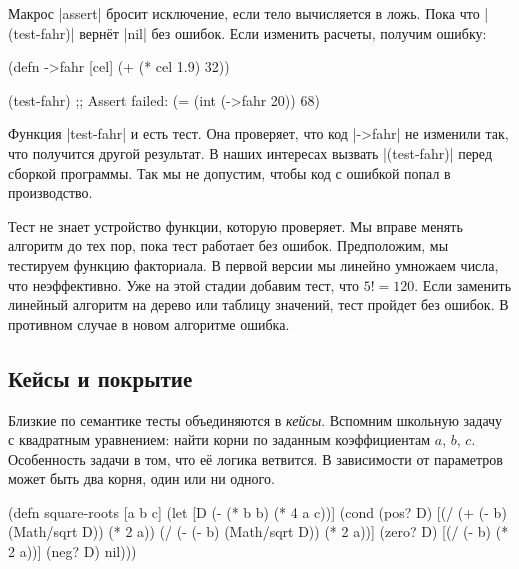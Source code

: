 Макрос \spverb|assert| бросит исключение, если тело вычисляется в ложь. Пока что
\spverb|(test-fahr)| вернёт \spverb|nil| без ошибок. Если изменить расчеты,
получим ошибку:

\begin{english}
  \begin{clojure}
(defn ->fahr [cel]
  (+ (* cel 1.9) 32))

(test-fahr)
;; Assert failed: (= (int (->fahr 20)) 68)
  \end{clojure}
\end{english}

Функция \spverb|test-fahr| и есть тест. Она проверяет, что код \spverb|->fahr|
не изменили так, что получится другой результат. В наших интересах вызвать
\spverb|(test-fahr)| перед сборкой программы. Так мы не допустим, чтобы код с
ошибкой попал в производство.


Тест не знает устройство функции, которую проверяет. Мы вправе менять алгоритм
до тех пор, пока тест работает без ошибок. Предположим, мы тестируем функцию
факториала. В первой версии мы линейно умножаем числа, что неэффективно. Уже на
этой стадии добавим тест, что $5! = 120$. Если заменить линейный алгоритм на
дерево или таблицу значений, тест пройдет без ошибок. В противном случае в новом
алгоритме ошибка.

\subsection{Кейсы и покрытие}


Близкие по семантике тесты объединяются в \emph{кейсы}. Вспомним школьную задачу
с квадратным уравнением: найти корни по заданным коэффициентам $a$, $b$,
$c$. Особенность задачи в том, что её логика ветвится. В зависимости от
параметров может быть два корня, один или ни одного.


\begin{english}
  \begin{clojure}
(defn square-roots [a b c]
  (let [D (- (* b b) (* 4 a c))]
    (cond
      (pos? D) [(/ (+ (- b) (Math/sqrt D)) (* 2 a))
                (/ (- (- b) (Math/sqrt D)) (* 2 a))]
      (zero? D) [(/ (- b) (* 2 a))]
      (neg? D) nil)))
  \end{clojure}
\end{english}

